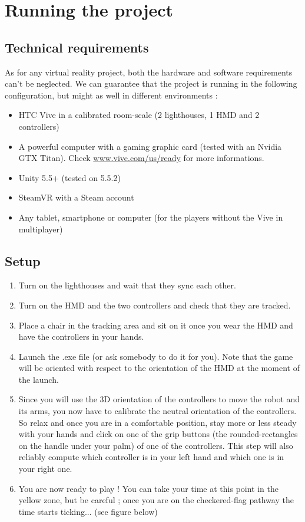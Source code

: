\documentclass[12pt]{article}
\begin{document}
\section{Running the project}

\subsection{Technical requirements}

As for any virtual reality project, both the hardware and software requirements can't be neglected. We can guarantee that the project is running in the following configuration, but might as well in different environments :

\begin{itemize}
	\item HTC Vive in a calibrated room-scale (2 lighthouses, 1 HMD and 2 controllers)
	\item A powerful computer with a gaming graphic card (tested with an Nvidia GTX Titan). Check \href{https://www.vive.com/us/ready/}{www.vive.com/us/ready} for more informations.
	\item Unity 5.5+ (tested on 5.5.2)
	\item SteamVR with a Steam account
	\item Any tablet, smartphone or computer (for the players without the Vive in multiplayer)
\end{itemize}

\subsection{Setup}

\begin{enumerate}
	\item Turn on the lighthouses and wait that they sync each other.
	\item Turn on the HMD and the two controllers and check that they are tracked.
	\item Place a chair in the tracking area and sit on it once you wear the HMD and have the controllers in your hands.
	\item Launch the .exe file (or ask somebody to do it for you). Note that the game will be oriented with respect to the orientation of the HMD at the moment of the launch.
	\item Since you will use the 3D orientation of the controllers to move the robot and its arms, you now have to calibrate the neutral orientation of the controllers. So relax and once you are in a comfortable position, stay more or less steady with your hands and click on one of the grip buttons (the rounded-rectangles on the handle under your palm) of one of the controllers. This step will also reliably compute which controller is in your left hand and which one is in your right one.
	\item You are now ready to play ! You can take your time at this point in the yellow zone, but be careful ; once you are on the checkered-flag pathway the time starts ticking... (see figure below)
\end{enumerate}
\end{document}
